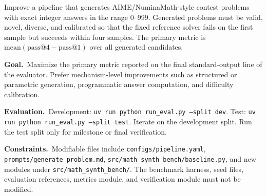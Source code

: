 \begin{promptbox}[title=\textbf{Math-Reasoning Data Synthesis Task Instruction}]
Improve a pipeline that generates AIME/NuminaMath-style contest problems
with exact integer answers in the range 0--999.
Generated problems must be valid, novel, diverse, and calibrated so that the
fixed reference solver fails on the first sample but succeeds within four
samples.
The primary metric is $\mathrm{mean}(\mathrm{pass@4} - \mathrm{pass@1})$ over all
generated candidates.

\smallskip
\noindent\textbf{Goal.}~Maximize the primary metric reported on the final
standard-output line of the evaluator.
Prefer mechanism-level improvements such as structured or parametric
generation, programmatic answer computation, and difficulty calibration.

\smallskip
\noindent\textbf{Evaluation.}~Development: \texttt{uv run python run\_eval.py --split dev}.
Test: \texttt{uv run python run\_eval.py --split test}.
Iterate on the development split. Run the test split only for milestone or
final verification.

\smallskip
\noindent\textbf{Constraints.}~Modifiable files include
\texttt{configs/pipeline.yaml}, \texttt{prompts/generate\_problem.md},
\texttt{src/math\_synth\_bench/baseline.py}, and new modules under
\texttt{src/math\_synth\_bench/}.
The benchmark harness, seed files, evaluation references, metrics module,
and verification module must not be modified.
\end{promptbox}

\FloatBarrier
